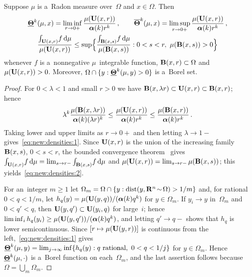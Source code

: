 \documentclass[a4paper,twoside,leqno]{article}
\begin{document}
\begin{lemma}[new]
    \label{new:densities}
    Suppose $\mu$ is a~Radon measure over~$\Omega$ and $x \in \Omega$. Then
    \begin{gather}
        \label{eq:new:densities:1}
        \boldsymbol{\underline{\Theta}}^{k}(\mu,x) = \liminf_{r \to 0+} \frac{\mu(\mathbf{U}(x,r))}{\boldsymbol{\alpha}(k)
        r^{k}} \,, \qquad
        \boldsymbol{\overline{\Theta}}^{k}(\mu,x) = \limsup_{r \to 0+} \frac{\mu(\mathbf{U}(x,r))}{\boldsymbol{\alpha}(k)
        r^{k}} \,, \\
        \label{eq:new:densities:2}
        \frac{{\textstyle\int_{\mathbf{U}(x,r)}^{}} f \,\mathrm{d} \mu}{\mu(\mathbf{U}(x,r))} \le \sup \Bigl\{
        \frac{{\textstyle\int_{\mathbf{B}(x,s)}^{}} f \,\mathrm{d} \mu}{\mu(\mathbf{B}(x,s))} : 0 < s < r,\ \mu(\mathbf{B}(x,s)) > 0
        \Bigr\}
    \end{gather}
    whenever $f$ is a~nonnegative $\mu$~integrable function, $\mathbf{B}(x,r) \subset \Omega$ and
    $\mu(\mathbf{U}(x,r)) > 0$. Moreover, $\Omega \cap \{ y : \boldsymbol{\underline{\Theta}}^{k}(\mu,y) > 0 \}$ is
    a~Borel set.
\end{lemma}

\begin{proof}
    For $0 < \lambda < 1$ and small $r > 0$ we have $\mathbf{B}(x,\lambda r) \subset \mathbf{U}(x,r) \subset
    \mathbf{B}(x,r)$; hence
    \begin{displaymath}
        \lambda^{k} \frac{\mu(\mathbf{B}(x,\lambda r))}{\boldsymbol{\alpha}(k) (\lambda r)^{k}}
        \le \frac{\mu(\mathbf{U}(x,r))}{\boldsymbol{\alpha}(k) r^{k}} \le
        \frac{\mu(\mathbf{B}(x,r))}{\boldsymbol{\alpha}(k) r^{k}} \,.
    \end{displaymath}
    Taking lower and upper limits as $r \to 0+$ and then letting $\lambda \to 1-$
    gives~\eqref{eq:new:densities:1}. Since $\mathbf{U}(x,r)$ is the union of the increasing family
    $\mathbf{B}(x,s)$, $0 < s < r$, the bounded convergence theorem~\cite[2.4.9]{Federer1969} gives
    ${\textstyle\int_{\mathbf{U}(x,r)}^{}} f \,\mathrm{d} \mu = \lim_{s \to r-} {\textstyle\int_{\mathbf{B}(x,s)}^{}} f \,\mathrm{d} \mu$ and
    $\mu(\mathbf{U}(x,r)) = \lim_{s \to r-} \mu(\mathbf{B}(x,s))$; this
    yields~\eqref{eq:new:densities:2}.

    For an~integer $m \ge 1$ let $\Omega_m = \Omega \cap \{ y : \operatorname{dist}(y, \mathbf{R}^{n} \!\sim\! \Omega)
    > 1/m \}$ and, for rational $0 < q < 1/m$, let $h_q(y) = \mu(\mathbf{U}(y,q)) /
    (\boldsymbol{\alpha}(k) q^{k})$ for $y \in \Omega_m$. If $y_i \to y$ in~$\Omega_m$ and $0 < q' < q$,
    then $\mathbf{U}(y,q') \subset \mathbf{U}(y_i,q)$ for large~$i$; hence $\liminf_i h_q(y_i) \ge
    \mu(\mathbf{U}(y,q')) / (\boldsymbol{\alpha}(k) q^{k})$, and letting $q' \to q-$ shows that
    $h_q$ is lower semicontinuous. Since $[ r \mapsto \mu(\mathbf{U}(y,r)) ]$ is continuous from the
    left,~\eqref{eq:new:densities:1} gives $\boldsymbol{\underline{\Theta}}^{k}(\mu,y) = \lim_{j \to \infty} \inf
    \{ h_q(y) : q \text{ rational},\ 0 < q < 1/j \}$ for $y \in \Omega_m$. Hence
    $\boldsymbol{\underline{\Theta}}^{k}(\mu,\cdot)$ is a~Borel function on each~$\Omega_m$, and the last
    assertion follows because $\Omega = \bigcup_m \Omega_m$.
\end{proof}
\end{document}
